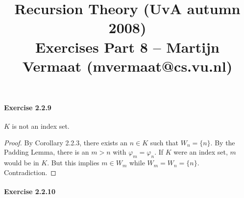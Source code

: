 \documentclass[a4paper,11pt]{article}
\title{Recursion Theory (UvA autumn 2008)\\
\normalsize{Exercises Part 8 -- Martijn Vermaat (mvermaat@cs.vu.nl)}}
\date{}
\begin{document}
\maketitle


\paragraph{Exercise 2.2.9}

$K$ is not an index set.

\begin{proof}
By Corollary 2.2.3, there exists an $n \in K$ such that $W_n = \{n\}$.
By the Padding Lemma, there is an $m > n$ with $\varphi_m = \varphi_n$.
If $K$ were an index set, $m$ would be in $K$.
But this implies $m \in W_m$ while $W_m = W_n = \{n\}$.
Contradiction.
\end{proof}


\paragraph{Exercise 2.2.10}
\end{document}
